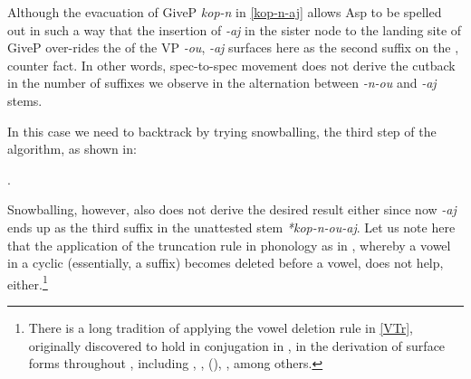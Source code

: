 \vskip -0.65cm
Although the evacuation of GiveP \textit{kop-n} in \ref{kop-n-aj} allows Asp to be spelled out in such a way that the insertion of \textit{-aj} in the sister node to the landing site of  GiveP over-rides the  of the VP \textit{-ou}, \textit{-aj} surfaces here as the second suffix on the , counter fact. In other words, spec-to-spec movement does not derive the cutback in the number of suffixes we observe in the alternation between  \textit{-n-ou} and  \textit{-aj} stems. 
\par
In this case we need to backtrack  by trying snowballing, the third step of the algorithm, as shown in: 

\ex.\label{kop-n-ou-aj}

\vskip 0.25cm	
Snowballing, however, also does not derive the desired result either since now \textit{-aj} ends up as the third suffix in the unattested stem \textit{*kop-n-ou-aj}.
Let us note here that the application of the truncation rule in  phonology as in \Next, whereby a vowel in a cyclic  (essentially, a suffix) becomes deleted before a vowel, does not help, either.\footnote{There is a long tradition of applying the vowel deletion  rule in \ref{VTr}, originally discovered to hold in  conjugation in \cite{Jakobson1948}, in the derivation of surface forms throughout , including \cite{Lightner1972}, \cite{Guss1980}, \citeauthor{Rubach1984} (\citeyear{Rubach1984,Rubach1993}), \cite{NH2009}, among others.
} %

